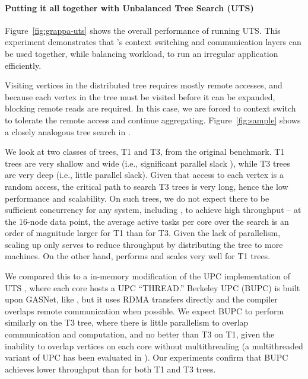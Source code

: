 \paragraph{Putting it all together with Unbalanced Tree Search (UTS)} 
Figure~\ref{fig:grappa-uts} shows the overall performance of \Grappa running
UTS. This experiment demonstrates that \Grappa's context
switching and communication layers can be used together, while
balancing workload, to run an irregular application efficiently. 

Visiting vertices in the distributed tree requires mostly remote
accesses, and because each vertex in the tree must be visited before
it can be expanded, blocking remote reads are required. In this case,
we are forced to context switch to tolerate the remote access and
continue aggregating. Figure~\ref{fig:sample} shows a closely analogous tree search in \Grappa.

We look at two classes of trees, T1 and T3, from
the original benchmark. T1 trees are very shallow and wide (i.e., significant
parallel slack \cite{Valiant:1990}), while T3 trees are very deep (i.e., little parallel slack).
Given that access to each vertex is a random access, the critical path to search
T3 trees is very long, hence the low performance and scalability. On such
trees, we do not expect there to be sufficient concurrency for any system,
including \Grappa, to achieve high throughput -- at the 16-node data point,
the average active tasks per core over the search is an order of magnitude larger for T1 than for T3.
 Given the lack of parallelism, scaling up only serves
to reduce throughput by distributing the tree to more machines.
On the other hand, \Grappa performs and scales very well for T1
trees.

We compared this to a in-memory modification of the UPC implementation
of UTS \cite{UTS}, where each core hosts a UPC ``THREAD.'' Berkeley
UPC (BUPC) is built upon GASNet, like \Grappa, but it uses RDMA transfers directly
and the compiler overlaps remote communication when possible. We expect BUPC to
perform similarly on the T3 tree, where there is little parallelism to
overlap communication and computation, and no better than T3 on T1,
given the inability to overlap vertices on each core without
multithreading (a multithreaded variant of UPC has been evaluated in
\cite{HotSLAW}). Our experiments confirm that BUPC achieves lower throughput than
\Grappa for both T1 and T3 trees.

